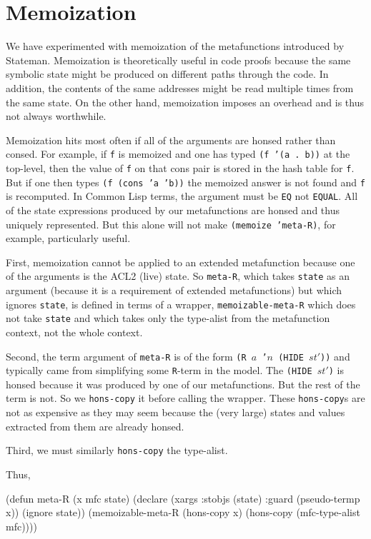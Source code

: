 \documentclass[submission,copyright,creativecommons]{eptcs}
\newcommand{\ptt}[1]{\tt{#1}}
\begin{document}
\section{Memoization}

We have experimented with memoization of the metafunctions introduced by Stateman.
Memoization is theoretically useful in code proofs because the same symbolic
state might be produced on different paths through the code.  In addition,
the contents of the same addresses might be read multiple times from the same state.
On the other hand, memoization imposes an overhead and is thus not always worthwhile.

Memoization hits most often if all of the arguments are honsed rather than
consed.  For example, if {\ptt{f}} is memoized and one has typed {\ptt{(f '(a . b))}} at the top-level,
then the value of {\ptt{f}} on that cons pair is stored in the hash table for {\ptt{f}}.  But if one then
types {\ptt{(f (cons 'a 'b))}} the memoized answer is not found and {\ptt{f}} is recomputed.
In Common Lisp terms, the argument must be {\ptt{EQ}} not
{\ptt{EQUAL}}.  All of the state expressions produced by our metafunctions
are honsed and thus uniquely represented.  But this alone will not make
{\ptt{(memoize 'meta-R)}}, for example, particularly useful.

First, memoization cannot be applied to an extended metafunction because one
of the arguments is the ACL2 (live) state.  So {\ptt{meta-R}}, which takes
{\ptt{state}} as an argument (because it is a requirement of extended
metafunctions) but which ignores {\ptt{state}}, is defined in terms of a wrapper,
{\ptt{memoizable-meta-R}} which does not take {\ptt{state}} and which takes
only the type-alist from the metafunction context, not the whole context.

Second, the term argument of {\ptt{meta-R}} is of the form {\ptt{(R $a$ '$n$
    (HIDE $st'$))}} and typically came from simplifying some {\ptt{R}}-term
in the model.  The {\ptt{(HIDE $st'$)}} is honsed because it was produced by
one of our metafunctions.  But the rest of the term is not.  So we
{\ptt{hons-copy}} it before calling the wrapper.  These {\ptt{hons-copy}}s
are not as expensive as they may seem because the (very large) states and
values extracted from them are already honsed.

Third, we must similarly {\ptt{hons-copy}} the type-alist.

Thus, 
\begin{acl2p}
(defun meta-R (x mfc state)
  (declare (xargs :stobjs (state)
                  :guard (pseudo-termp x))
           (ignore state))
  (memoizable-meta-R (hons-copy x)
                     (hons-copy (mfc-type-alist mfc))))
\end{acl2p}
\end{document}
